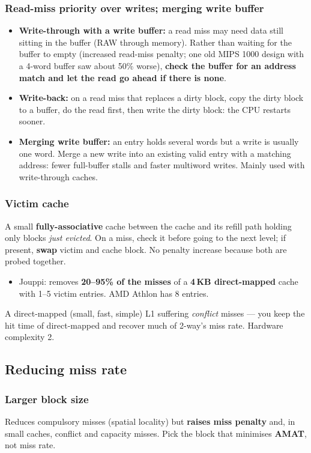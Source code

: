 \subsubsection{Read-miss priority over writes; merging write buffer}
\begin{itemize}
\item \textbf{Write-through with a write buffer:} a read miss may need data still sitting in the buffer (RAW through memory). Rather than waiting for the buffer to empty (increased read-miss penalty; one old MIPS 1000 design with a 4-word buffer saw about 50\% worse), \textbf{check the buffer for an address match and let the read go ahead if there is none}.
\item \textbf{Write-back:} on a read miss that replaces a dirty block, copy the dirty block to a buffer, do the read first, then write the dirty block: the CPU restarts sooner.
\item \textbf{Merging write buffer:} an entry holds several words but a write is usually one word. Merge a new write into an existing valid entry with a matching address: fewer full-buffer stalls and faster multiword writes. Mainly used with write-through caches.
\end{itemize}

\subsubsection{Victim cache}
A small \textbf{fully-associative} cache between the cache and its refill path holding only blocks \emph{just evicted}. On a miss, check it before going to the next level; if present, \textbf{swap} victim and cache block. No penalty increase because both are probed together.
\begin{itemize}
\item Jouppi: removes \textbf{20--95\% of the misses} of a \textbf{4\,KB direct-mapped} cache with 1--5 victim entries. AMD Athlon has 8 entries.
\end{itemize}
\begin{pick}
A direct-mapped (small, fast, simple) L1 suffering \emph{conflict} misses --- you keep the hit time of direct-mapped and recover much of 2-way's miss rate. Hardware complexity 2.
\end{pick}

\subsection{Reducing miss rate}
\subsubsection{Larger block size}
Reduces compulsory misses (spatial locality) but \textbf{raises miss penalty} and, in small caches, conflict and capacity misses. Pick the block that minimises \textbf{AMAT}, not miss rate.

